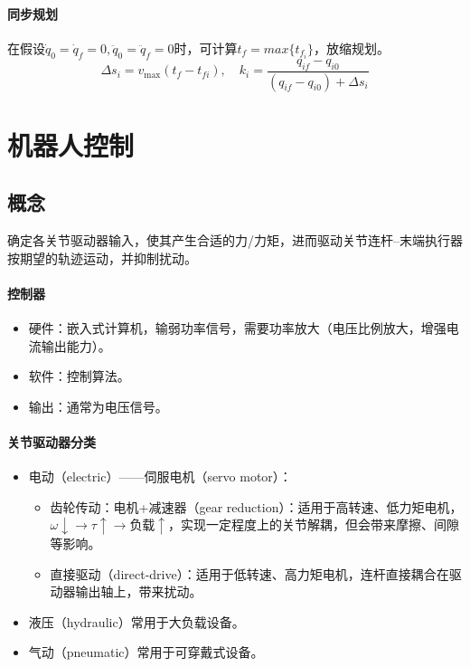 \documentclass[
12pt, %
a4paper, 
oneside, %
headinclude,footinclude, %
]{scrartcl}
\begin{document}
\paragraph{同步规划}
在假设$ \dot{q}_0 = \dot{q}_f = 0, \ddot{q}_0 = \ddot{q}_f = 0 $时，可计算$ t_f = max\{t_{f_i}\} $，放缩规划。
$$ \Delta s_i = v_{\max}(t_f - t_{fi}), \quad k_i = \frac{q_{if} - q_{i0}}{(q_{if} - q_{i0}) + \Delta s_i} $$
\section{机器人控制}
\subsection[概念]{概念}
确定各关节驱动器输入，使其产生合适的力/力矩，进而驱动关节连杆--末端执行器按期望的轨迹运动，并抑制扰动。
\paragraph{控制器}
\begin{itemize}
\item 硬件：嵌入式计算机，输弱功率信号，需要功率放大（电压比例放大，增强电流输出能力）。
\item 软件：控制算法。
\item 输出：通常为电压信号。
\end{itemize}
\paragraph{关节驱动器分类}
\begin{itemize}
\item 电动（electric）——伺服电机（servo motor）：
\begin{itemize}
\item 齿轮传动：电机+减速器（gear reduction）：适用于高转速、低力矩电机，$ \omega \downarrow \rightarrow \tau \uparrow \rightarrow \text{负载} \uparrow $，实现一定程度上的关节解耦，但会带来摩擦、间隙等影响。
\item 直接驱动（direct-drive）：适用于低转速、高力矩电机，连杆直接耦合在驱动器输出轴上，带来扰动。
\end{itemize}
\item 液压（hydraulic）常用于大负载设备。
\item 气动（pneumatic）常用于可穿戴式设备。
\end{itemize}
\end{document}
